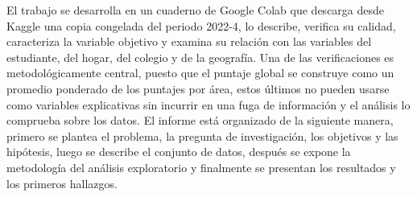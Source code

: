     El trabajo se desarrolla en un cuaderno de Google Colab que descarga desde
    Kaggle una copia congelada del periodo 2022-4, lo describe, verifica su 
    calidad, caracteriza la variable objetivo y examina su relación con las 
    variables del estudiante, del hogar, del colegio y de la geografía. Una 
    de las verificaciones es metodológicamente central, puesto que el puntaje 
    global se construye como un promedio ponderado de los puntajes por área, 
    estos últimos no pueden usarse como variables explicativas sin incurrir 
    en una fuga de información \cite{kaufman2012leakage} y el análisis lo 
    comprueba sobre los datos. El informe está organizado de la siguiente 
    manera, primero se plantea el problema, la pregunta de investigación, los 
    objetivos y las hipótesis, luego se describe el conjunto de datos, después 
    se expone la metodología del análisis exploratorio y finalmente se presentan 
    los resultados y los primeros hallazgos.